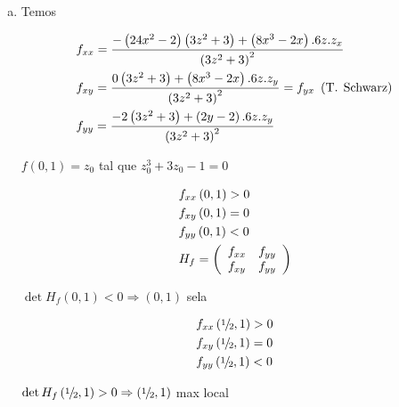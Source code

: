\documentclass[11pt, oneside, a4paper]{gsm-l}
\begin{document}
\begin{enumerate}
\begin{sol}
\begin{enumerate}[(a)]
    \item Temos

\[
\begin{gathered}
  f_{xx}  = \frac{{ - \left( {24x^2  - 2} \right)\left( {3z^2  + 3} \right) + \left( {8x^3  - 2x} \right).6z.z_x }}
{{\left( {3z^2  + 3} \right)^2 }} \hfill \\
  f_{xy}  = \frac{{0\left( {3z^2  + 3} \right) + \left( {8x^3  - 2x} \right).6z.z_y }}
{{\left( {3z^2  + 3} \right)^2 }} = f_{yx} {\text{ }}\left( {{\text{T}}{\text{. Schwarz}}} \right) \hfill \\
  f_{yy}  = \frac{{ - 2\left( {3z^2  + 3} \right) + \left( {2y - 2} \right).6z.z_y }}
{{\left( {3z^2  + 3} \right)^2 }} \hfill \\
\end{gathered}
\]

$f(0,1)=z_0$ tal que $z_0^3  + 3z_0  - 1 = 0$

\[
\begin{gathered}
  f_{xx} \left( {0,1} \right) > 0 \hfill \\
  f_{xy} \left( {0,1} \right) = 0 \hfill \\
  f_{yy} \left( {0,1} \right) < 0 \hfill \\
  H_f  = \left( {\begin{array}{*{20}c}
   {f_{xx} } & {f_{yy} }  \\
   {f_{xy} } & {f_{yy} }  \\

 \end{array} } \right) \hfill \\
\end{gathered}
\]

$\det H_f \left( {0,1} \right) < 0 \Rightarrow \left( {0,1} \right)$ sela

\[
\begin{gathered}
  f_{xx} \left( {{\raise0.5ex\hbox{$\scriptstyle 1$}
\kern-0.1em/\kern-0.15em
\lower0.25ex\hbox{$\scriptstyle 2$}},1} \right) > 0 \hfill \\
  f_{xy} \left( {{\raise0.5ex\hbox{$\scriptstyle 1$}
\kern-0.1em/\kern-0.15em
\lower0.25ex\hbox{$\scriptstyle 2$}},1} \right) = 0 \hfill \\
  f_{yy} \left( {{\raise0.5ex\hbox{$\scriptstyle 1$}
\kern-0.1em/\kern-0.15em
\lower0.25ex\hbox{$\scriptstyle 2$}},1} \right) < 0 \hfill \\
\end{gathered}
\]

$\det H_f \left( {{\raise0.5ex\hbox{$\scriptstyle 1$}
\kern-0.1em/\kern-0.15em
\lower0.25ex\hbox{$\scriptstyle 2$}},1} \right) > 0 \Rightarrow \left( {{\raise0.5ex\hbox{$\scriptstyle 1$}
\kern-0.1em/\kern-0.15em
\lower0.25ex\hbox{$\scriptstyle 2$}},1} \right)$ max local


\end{enumerate}
\end{sol}
\end{enumerate}
\end{document}
